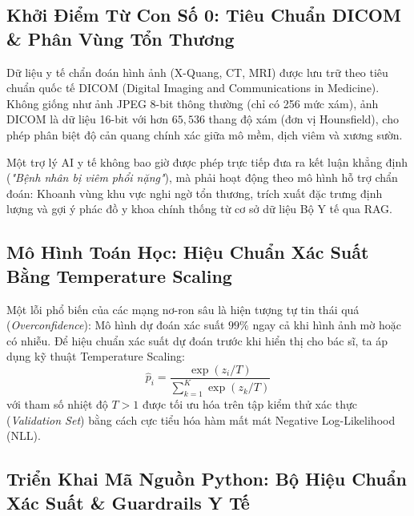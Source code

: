 \subsection{Khởi Điểm Từ Con Số 0: Tiêu Chuẩn DICOM \& Phân Vùng Tổn Thương}
Dữ liệu y tế chẩn đoán hình ảnh (X-Quang, CT, MRI) được lưu trữ theo tiêu chuẩn quốc tế DICOM (Digital Imaging and Communications in Medicine). Không giống như ảnh JPEG 8-bit thông thường (chỉ có 256 mức xám), ảnh DICOM là dữ liệu 16-bit với hơn $65,536$ thang độ xám (đơn vị Hounsfield), cho phép phân biệt độ cản quang chính xác giữa mô mềm, dịch viêm và xương sườn.

Một trợ lý AI y tế không bao giờ được phép trực tiếp đưa ra kết luận khẳng định (\textit{"Bệnh nhân bị viêm phổi nặng"}), mà phải hoạt động theo mô hình hỗ trợ chẩn đoán: Khoanh vùng khu vực nghi ngờ tổn thương, trích xuất đặc trưng định lượng và gợi ý phác đồ y khoa chính thống từ cơ sở dữ liệu Bộ Y tế qua RAG.

\subsection{Mô Hình Toán Học: Hiệu Chuẩn Xác Suất Bằng Temperature Scaling}
Một lỗi phổ biến của các mạng nơ-ron sâu là hiện tượng tự tin thái quá (\textit{Overconfidence}): Mô hình dự đoán xác suất $99\%$ ngay cả khi hình ảnh mờ hoặc có nhiễu.
Để hiệu chuẩn xác suất dự đoán trước khi hiển thị cho bác sĩ, ta áp dụng kỹ thuật Temperature Scaling:
\begin{equation}
\hat{p}_i = \frac{\exp(z_i / T)}{\sum_{k=1}^K \exp(z_k / T)}
\end{equation}
với tham số nhiệt độ $T > 1$ được tối ưu hóa trên tập kiểm thử xác thực (\textit{Validation Set}) bằng cách cực tiểu hóa hàm mất mát Negative Log-Likelihood (NLL).

\subsection{Triển Khai Mã Nguồn Python: Bộ Hiệu Chuẩn Xác Suất \& Guardrails Y Tế}

